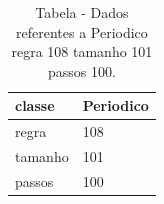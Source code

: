 \begin{table}[H]
\centering
\caption{Tabela - Dados referentes a Periodico regra 108 tamanho 101 passos 100.}
\label{tab:Periodico_regra_108_tamanho_101_passos_100}
\begin{tabular}{ll}
\toprule
classe & Periodico \\
\midrule
regra & 108 \\
tamanho & 101 \\
passos & 100 \\
\bottomrule
\end{tabular}

\end{table}
